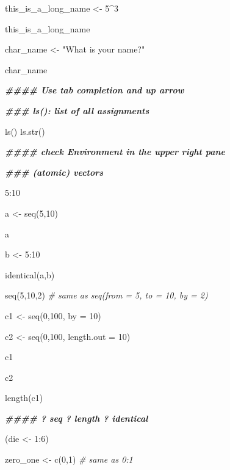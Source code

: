 \documentclass[
]{bxjsbook}
\newenvironment{Shaded}{\begin{snugshade}}{\end{snugshade}}
\newcommand{\AttributeTok}[1]{\textcolor[rgb]{0.77,0.63,0.00}{#1}}
\newcommand{\CommentTok}[1]{\textcolor[rgb]{0.56,0.35,0.01}{\textit{#1}}}
\newcommand{\DecValTok}[1]{\textcolor[rgb]{0.00,0.00,0.81}{#1}}
\newcommand{\DocumentationTok}[1]{\textcolor[rgb]{0.56,0.35,0.01}{\textbf{\textit{#1}}}}
\newcommand{\FunctionTok}[1]{\textcolor[rgb]{0.00,0.00,0.00}{#1}}
\newcommand{\NormalTok}[1]{#1}
\newcommand{\OtherTok}[1]{\textcolor[rgb]{0.56,0.35,0.01}{#1}}
\newcommand{\SpecialCharTok}[1]{\textcolor[rgb]{0.00,0.00,0.00}{#1}}
\newcommand{\StringTok}[1]{\textcolor[rgb]{0.31,0.60,0.02}{#1}}
\theoremstyle{definition}
\theoremstyle{definition}
\theoremstyle{definition}
\theoremstyle{definition}
\theoremstyle{remark}
\begin{document}
\begin{Shaded}
\begin{Highlighting}[]
\NormalTok{this\_is\_a\_long\_name }\OtherTok{\textless{}{-}} \DecValTok{5}\SpecialCharTok{\^{}}\DecValTok{3}

\NormalTok{this\_is\_a\_long\_name}

\NormalTok{char\_name }\OtherTok{\textless{}{-}} \StringTok{"What is your name?"}

\NormalTok{char\_name}

\DocumentationTok{\#\#\#\# Use \textquotesingle{}tab completion\textquotesingle{} and \textquotesingle{}up arrow\textquotesingle{}}

\DocumentationTok{\#\#\# ls(): list of all assignments}

\FunctionTok{ls}\NormalTok{()}
\FunctionTok{ls.str}\NormalTok{()}

\DocumentationTok{\#\#\#\# check Environment in the upper right pane}

\DocumentationTok{\#\#\# (atomic) vectors}

\DecValTok{5}\SpecialCharTok{:}\DecValTok{10}

\NormalTok{a }\OtherTok{\textless{}{-}} \FunctionTok{seq}\NormalTok{(}\DecValTok{5}\NormalTok{,}\DecValTok{10}\NormalTok{)}

\NormalTok{a}

\NormalTok{b }\OtherTok{\textless{}{-}} \DecValTok{5}\SpecialCharTok{:}\DecValTok{10}

\FunctionTok{identical}\NormalTok{(a,b)}

\FunctionTok{seq}\NormalTok{(}\DecValTok{5}\NormalTok{,}\DecValTok{10}\NormalTok{,}\DecValTok{2}\NormalTok{) }\CommentTok{\# same as seq(from = 5, to = 10, by = 2)}

\NormalTok{c1 }\OtherTok{\textless{}{-}} \FunctionTok{seq}\NormalTok{(}\DecValTok{0}\NormalTok{,}\DecValTok{100}\NormalTok{, }\AttributeTok{by =} \DecValTok{10}\NormalTok{)}

\NormalTok{c2 }\OtherTok{\textless{}{-}} \FunctionTok{seq}\NormalTok{(}\DecValTok{0}\NormalTok{,}\DecValTok{100}\NormalTok{, }\AttributeTok{length.out =} \DecValTok{10}\NormalTok{)}

\NormalTok{c1}

\NormalTok{c2}

\FunctionTok{length}\NormalTok{(c1)}

\DocumentationTok{\#\#\#\# ? seq   ? length   ? identical}

\NormalTok{(die }\OtherTok{\textless{}{-}} \DecValTok{1}\SpecialCharTok{:}\DecValTok{6}\NormalTok{)}

\NormalTok{zero\_one }\OtherTok{\textless{}{-}} \FunctionTok{c}\NormalTok{(}\DecValTok{0}\NormalTok{,}\DecValTok{1}\NormalTok{) }\CommentTok{\# same as 0:1}


\end{Highlighting}
\end{Shaded}
\end{document}
